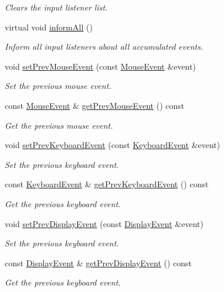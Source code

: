 \begin{DoxyCompactItemize}
\begin{DoxyCompactList}\small\item\em Clears the input listener list. \end{DoxyCompactList}\item 
virtual void \mbox{\hyperlink{classec_1_1_input_observable_ac8ac61eaebb95010e8a12bb1e6348391}{inform\+All}} ()
\begin{DoxyCompactList}\small\item\em Inform all input listeners about all accumulated events. \end{DoxyCompactList}\item 
void \mbox{\hyperlink{classec_1_1_input_observable_acf16d74cb1f51ee631e017280fff8052}{set\+Prev\+Mouse\+Event}} (const \mbox{\hyperlink{structec_1_1_mouse_event}{Mouse\+Event}} \&event)
\begin{DoxyCompactList}\small\item\em Set the previous mouse event. \end{DoxyCompactList}\item 
const \mbox{\hyperlink{structec_1_1_mouse_event}{Mouse\+Event}} \& \mbox{\hyperlink{classec_1_1_input_observable_abf9f1388171a99581a0a4100bbf2d11b}{get\+Prev\+Mouse\+Event}} () const
\begin{DoxyCompactList}\small\item\em Get the previous mouse event. \end{DoxyCompactList}\item 
void \mbox{\hyperlink{classec_1_1_input_observable_afcc8abf8d747417f50465189e632d0dd}{set\+Prev\+Keyboard\+Event}} (const \mbox{\hyperlink{structec_1_1_keyboard_event}{Keyboard\+Event}} \&event)
\begin{DoxyCompactList}\small\item\em Set the previous keyboard event. \end{DoxyCompactList}\item 
const \mbox{\hyperlink{structec_1_1_keyboard_event}{Keyboard\+Event}} \& \mbox{\hyperlink{classec_1_1_input_observable_ab1ba2fa8deaf1d69a4809e4d8dc61452}{get\+Prev\+Keyboard\+Event}} () const
\begin{DoxyCompactList}\small\item\em Get the previous keyboard event. \end{DoxyCompactList}\item 
void \mbox{\hyperlink{classec_1_1_input_observable_a55c7310a50dc873f69c2246bbeeed3e6}{set\+Prev\+Display\+Event}} (const \mbox{\hyperlink{structec_1_1_display_event}{Display\+Event}} \&event)
\begin{DoxyCompactList}\small\item\em Set the previous keyboard event. \end{DoxyCompactList}\item 
const \mbox{\hyperlink{structec_1_1_display_event}{Display\+Event}} \& \mbox{\hyperlink{classec_1_1_input_observable_ac12e711d3a7dcaf65d2028d2283c1243}{get\+Prev\+Display\+Event}} () const
\begin{DoxyCompactList}\small\item\em Get the previous keyboard event. \end{DoxyCompactList}\end{DoxyCompactItemize}
